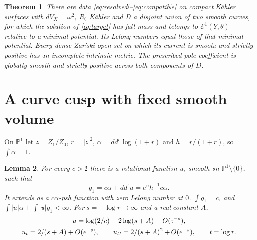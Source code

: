 \documentclass[11pt]{article}
\newtheorem{theorem}{Theorem}
\newtheorem{lemma}[theorem]{Lemma}
\newcommand{\ddc}{dd^c}
\newcommand{\CP}{\mathbb P}
\begin{document}
\begin{theorem}\label{thm:main}
There are data \eqref{eq:resolved}--\eqref{eq:compatible} on compact
K\"ahler surfaces with $dV_X=\omega^2$, $R_0$ K\"ahler and
$D$ a disjoint union of two smooth curves, for which the solution
of \eqref{eq:target} has full mass and belongs to
$\mathcal E^1(Y,\theta)$ relative to a minimal potential.
Its Lelong numbers equal those of that minimal potential.
Every dense Zariski open set on which its current is smooth and
strictly positive has an incomplete intrinsic metric.
The prescribed pole coefficient is globally smooth and strictly
positive across both components of $D$.
\end{theorem}

\section{A curve cusp with fixed smooth volume}
On $\CP^1$ let $z=Z_1/Z_0$, $r=|z|^2$,
$\alpha=\ddc\log(1+r)$ and $h=r/(1+r)$, so $\int\alpha=1$.
\begin{lemma}\label{lem:cusp}
For every $c>2$ there is a rotational function $u$, smooth on
$\CP^1\setminus\{0\}$, such that
\begin{equation}\label{eq:curve}
 g_1=c\alpha+\ddc u=e^u h^{-1}c\alpha.
\end{equation}
It extends as a $c\alpha$-psh function with zero Lelong number at $0$,
$\int g_1=c$, and $\int|u|\alpha+\int|u|g_1<\infty$.
For $s=-\log r\to\infty$ and a real constant $A$,
\begin{gather}\label{eq:cusp}
 u=\log(2/c)-2\log(s+A)+O(e^{-s}),\\
 u_t=2/(s+A)+O(e^{-s}),\qquad
 u_{tt}=2/(s+A)^2+O(e^{-s}),\qquad t=\log r.\notag
\end{gather}
\end{lemma}
\end{document}
